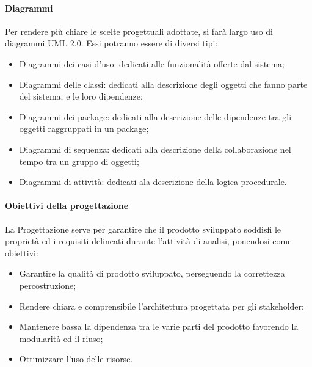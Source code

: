 \paragraph{Diagrammi}\label{Progettazione_Diagrammi}
Per rendere più chiare le scelte progettuali adottate, si farà largo uso di diagrammi UML 2.0\glossario. Essi potranno essere di diversi tipi:
\begin{itemize}
	\item Diagrammi dei casi d'uso: dedicati alle funzionalità offerte dal sistema;
	\item Diagrammi delle classi: dedicati alla descrizione degli oggetti che fanno parte del sistema, e le loro dipendenze;
	\item Diagrammi dei package: dedicati alla descrizione delle dipendenze tra gli oggetti raggruppati in un package;
	\item Diagrammi di sequenza: dedicati alla descrizione della collaborazione nel tempo tra un gruppo di oggetti;
	\item Diagrammi di attività: dedicati ala descrizione della logica procedurale.
\end{itemize}

\paragraph{Obiettivi della progettazione}\label{Progettazione_Obiettivi}
La Progettazione serve per garantire che il prodotto sviluppato soddisfi le proprietà ed i requisiti delineati durante l'attività di analisi, ponendosi come obiettivi:
\begin{itemize}
	\item Garantire la qualità di prodotto sviluppato, perseguendo la correttezza percostruzione;
	\item Rendere chiara e comprensibile l'architettura progettata per gli stakeholder;
	\item Mantenere bassa la dipendenza tra le varie parti del prodotto favorendo la modularità ed il riuso;
	\item Ottimizzare l'uso delle risorse.
\end{itemize}